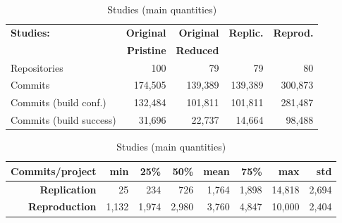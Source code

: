 \begin{table}[h]
\caption{Studies (main quantities)}
\label{table:statistics}
\begin{center}
\begin{tabular}{lrrrr}
\toprule
\textbf{Studies:}        & \textbf{Original} & \textbf{Original} & \textbf{Replic.} & \textbf{Reprod.} \\
                         & \textbf{Pristine} & \textbf{Reduced} \\
\midrule
Repositories             & 100               & 79                & 79               & 80      \\
Commits                  & 174,505           & 139,389           & 139,389          & 300,873 \\
Commits (build conf.)    & 132,484           & 101,811           & 101,811          & 281,487 \\
Commits (build success)  & 31,696            &  22,737           & 14,664           & 98,488  \\
\bottomrule
\end{tabular}
\end{center}

\begin{center}
\begin{tabular}{rrrrrrrr}
\toprule 
\textbf{Commits/project}  & \bf{min} & \bf{25\%} & \bf{50\%} & \bf{mean}  & \bf{75\%} & \bf{max}  & \bf{std} \\

\midrule
\bf{Replication}   &       25 &          234 &         726 &    1,764 &       1,898 &    14,818 & 2,694 \\
\bf{Reproduction}  &    1,132 &        1,974 &       2,980 &    3,760 &       4,847 &    10,000 & 2,404 \\




\bottomrule
\end{tabular}
\end{center}

\end{table}

